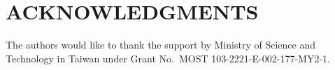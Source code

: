 \documentclass{sig-alternate}
\begin{document}

\section{ACKNOWLEDGMENTS}

The authors would like to thank the support by Ministry of Science and Technology in Taiwan under Grant No.\ MOST 103-2221-E-002-177-MY2-1.


%
\end{document}

